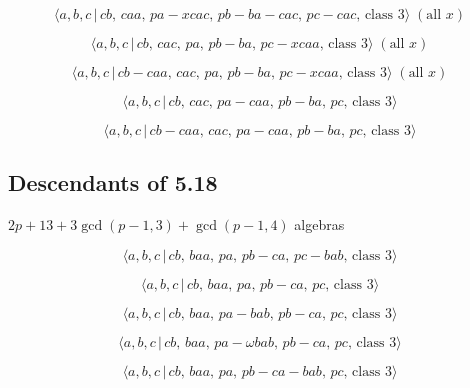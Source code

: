 \documentclass[10pt]{article}
\begin{document}
\begin{equation}
\langle a,b,c\,|\,cb,\,caa,\,pa-xcac,\,pb-ba-cac,\,pc-cac,\,\text{class }%
3\rangle\;(\text{all }x)  \tag{6.288}
\end{equation}

\begin{equation}
\langle a,b,c\,|\,cb,\,cac,\,pa,\,pb-ba,\,pc-xcaa,\,\text{class }3\rangle\;(%
\text{all }x)  \tag{6.289}
\end{equation}

\begin{equation}
\langle a,b,c\,|\,cb-caa,\,cac,\,pa,\,pb-ba,\,pc-xcaa,\,\text{class }%
3\rangle\;(\text{all }x)  \tag{6.290}
\end{equation}

\begin{equation}
\langle a,b,c\,|\,cb,\,cac,\,pa-caa,\,pb-ba,\,pc,\,\text{class }3\rangle 
\tag{6.291}
\end{equation}

\begin{equation}
\langle a,b,c\,|\,cb-caa,\,cac,\,pa-caa,\,pb-ba,\,pc,\,\text{class }3\rangle
\tag{6.292}
\end{equation}

\subsection{Descendants of 5.18}

$2p+13+3\gcd (p-1,3)+\gcd (p-1,4)$ algebras

\begin{equation}
\langle a,b,c\,|\,cb,\,baa,\,pa,\,pb-ca,\,pc-bab,\,\text{class }3\rangle 
\tag{6.293}
\end{equation}

\begin{equation}
\langle a,b,c\,|\,cb,\,baa,\,pa,\,pb-ca,\,pc,\,\text{class }3\rangle 
\tag{6.294}
\end{equation}

\begin{equation}
\langle a,b,c\,|\,cb,\,baa,\,pa-bab,\,pb-ca,\,pc,\,\text{class }3\rangle 
\tag{6.295}
\end{equation}

\begin{equation}
\langle a,b,c\,|\,cb,\,baa,\,pa-\omega bab,\,pb-ca,\,pc,\,\text{class }%
3\rangle  \tag{6.296}
\end{equation}

\begin{equation}
\langle a,b,c\,|\,cb,\,baa,\,pa,\,pb-ca-bab,\,pc,\,\text{class }3\rangle 
\tag{6.297}
\end{equation}
\end{document}
